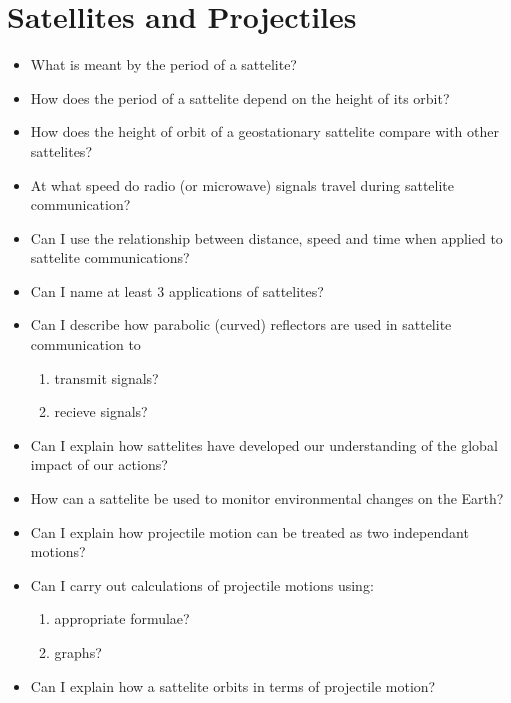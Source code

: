 \section{Satellites and Projectiles}
\begin{multicols}{2}
	\begin{itemize}
		\item What is meant by the period of a sattelite?
		\item How does the period of a sattelite depend on the height of its orbit?
		\item How does the height of orbit of a geostationary sattelite compare with
			other sattelites?
		\item At what speed do radio (or microwave) signals travel during sattelite
			communication?
		\item  Can I use the relationship between distance, speed and time when
			applied to sattelite communications?
		\item Can I name at least 3 applications of sattelites?
		\item Can I describe how parabolic (curved) reflectors are used in sattelite
			communication to
			\begin{enumerate}[label=(\alph*)]
				\item transmit signals?
				\item recieve signals?
			\end{enumerate}
		\item Can I explain how sattelites have developed our understanding of the
			global impact of our actions?
		\item How can a sattelite be used to monitor environmental changes on the
			Earth?
		\item Can I explain how projectile motion can be treated as two independant
			motions?
		\item Can I carry out calculations of projectile motions using:
			\begin{enumerate}
				\item appropriate formulae?
				\item graphs?
			\end{enumerate}
		\item Can I explain how a sattelite orbits in terms of projectile motion?
	\end{itemize}
\end{multicols}

